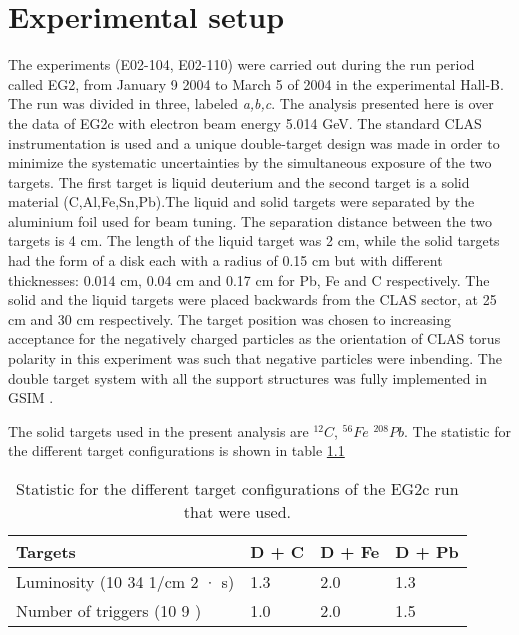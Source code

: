 \chapter{Experimental setup}
\label{ch:experiment}
The experiments (E02-104, E02-110) were carried out during the run period called EG2, from January 9 2004 to March 5 of 2004 in the experimental Hall-B. The run was divided in three, labeled {\it a,b,c}. The analysis presented here is over the data of EG2c with electron beam energy 5.014 GeV. The standard CLAS instrumentation is used and a unique double-target design was made in order to minimize the systematic uncertainties by the simultaneous exposure of the two targets. The first target is liquid deuterium and the second target is a solid material (C,Al,Fe,Sn,Pb).The liquid and solid targets were separated by the aluminium foil used for beam tuning. The separation distance between the two targets is 4 cm. The length of the liquid  target was 2 cm, while the solid targets had the form of a disk each with a radius of 0.15 cm but with different thicknesses: 0.014 cm, 0.04 cm and 0.17 cm for Pb, Fe and C respectively. The solid and the liquid targets were placed backwards from the CLAS sector, at 25 cm and 30 cm respectively. The target position was chosen to increasing acceptance for the negatively charged particles as the orientation of CLAS torus polarity in this experiment was such that negative particles were inbending. The double target system with all the support structures was fully implemented in GSIM \cite{target}.

The solid targets used in the present analysis are $^{12} C$, $^{56} Fe$ $^{208} Pb$. The statistic for the different target configurations is shown in table \ref{tb:target_stat}
\begin{table}
\begin{center}
\begin{tabular}{|l|l|l|l|}
\hline
Targets&D + C&D + Fe&D + Pb\\
\hline
Luminosity (10 34 1/cm 2 · s)& 1.3 & 2.0 & 1.3\\
\hline
Number of triggers (10 9 ) & 1.0 & 2.0 & 1.5\\
\hline
\end{tabular}
\caption{Statistic for the different target configurations of the EG2c run that were used.}
\label{tb:target_stat}
\end{center}
\end{table}

%